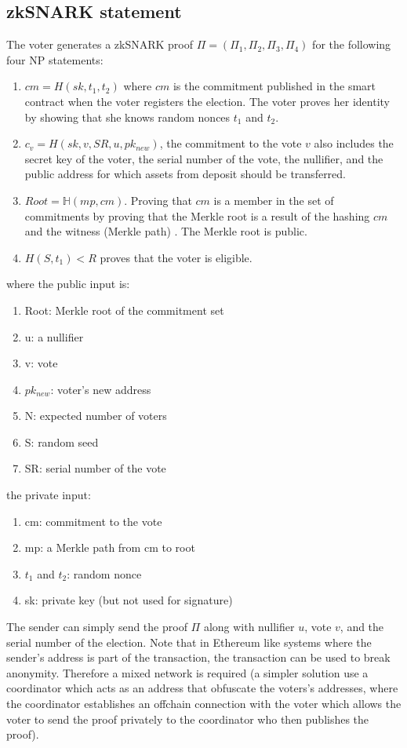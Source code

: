 \documentclass[]{paper}
\begin{document}
					\subsection{zkSNARK statement}
					The voter generates a zkSNARK proof $\Pi = (\Pi_1,\Pi_2,\Pi_3,\Pi_4)$ for the following four NP statements:
					\begin{enumerate}
						\item $cm = H(sk,t_1,t_2)$ where $cm$ is the commitment published in the smart contract when the voter registers the election. The voter proves her identity by showing that she knows random nonces $t_1$ and $t_2$. 
						\item $c_v= H(sk,v,SR,u,pk_{new})$, the commitment to the vote $v$ also includes the secret key of the voter, the serial number of the vote, the nullifier, and the public address for which assets from deposit should be transferred.
						\item $Root = \mathbb{H}(mp, cm)$. Proving that $cm$ is a member in the set of commitments by proving that the Merkle root is a result of the hashing $cm$ and the witness (Merkle path) . The Merkle root is public.
						\item $H(S,t_1)<R$ proves that the voter is eligible.
					\end{enumerate}
					where the public input is:
					\begin{enumerate}
						\item Root: Merkle root of the commitment set
						\item u: a nullifier
						\item v: vote  
						\item $pk_{new}$: voter's new address
						\item N: expected number of voters
						\item S: random seed
						\item SR: serial number of the vote
					\end{enumerate}	
					the private input:
					\begin{enumerate}
						\item cm: commitment to the vote
						\item mp: a Merkle path from cm to root
						\item $t_1$ and $t_2$: random nonce
						\item sk: private key (but not used for signature)
					\end{enumerate}	
					The sender can simply send the proof $\Pi$ along with nullifier $u$, vote $v$, and the serial number of the election. Note that  in Ethereum like systems where the sender's address is part of the transaction, the transaction can be used to break anonymity. Therefore a mixed network is required (a simpler solution use a coordinator which acts as an address that obfuscate the voters's addresses, where the coordinator establishes an offchain connection with the voter which allows the voter to send the proof privately to the coordinator who then publishes the proof).     
					
\end{document}
